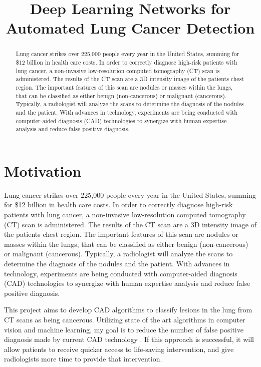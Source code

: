\documentclass[conference,11pt]{IEEEtran}
\title{Deep Learning Networks for Automated Lung Cancer Detection}
\author{
    \IEEEauthorblockN{Benjamin Hillmann}
    \IEEEauthorblockA{
        \today
    }
}
\begin{document}
\onecolumn
\maketitle

\begin{abstract}
Lung cancer strikes over 225,000 people every year in the United States, summing for \$12 billion in health care costs. In order to correctly diagnose high-risk patients with lung cancer, a non-invasive low-resolution computed tomography (CT) scan is administered. The results of the CT scan are a 3D intensity image of the patients chest region. The important features of this scan are nodules or masses within the lungs, that can be classified as either benign (non-cancerous) or malignant (cancerous). Typically, a radiologist will analyze the scans to determine the diagnosis of the nodules and the patient. With advances in technology, experiments are being conducted with computer-aided diagnosis (CAD) technologies to synergize with human expertise analysis and reduce false positive diagnosis.
\end{abstract}

\section{Motivation}

Lung cancer strikes over 225,000 people every year in the United States, summing for \$12 billion in health care costs. In order to correctly diagnose high-risk patients with lung cancer, a non-invasive low-resolution computed tomography (CT) scan is administered. The results of the CT scan are a 3D intensity image of the patients chest region. The important features of this scan are nodules or masses within the lungs, that can be classified as either benign (non-cancerous) or malignant (cancerous). Typically, a radiologist will analyze the scans to determine the diagnosis of the nodules and the patient. With advances in technology, experiments are being conducted with computer-aided diagnosis (CAD) technologies to synergize with human expertise analysis and reduce false positive diagnosis.

This project aims to develop CAD algorithms to classify lesions in the lung from CT scans as being cancerous. Utilizing state of the art algorithms in computer vision and machine learning, my goal is to reduce the number of false positive diagnosis made by current CAD technology \cite{sun_automatic_2017}. If this approach is successful, it will allow patients to receive quicker access to life-saving intervention, and give radiologists more time to provide that intervention.
\end{document}
